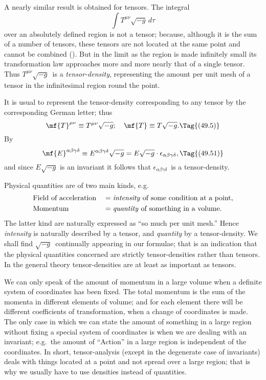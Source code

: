 \documentclass[12pt]{book}
\begin{document}
A nearly similar result is obtained for tensors. The integral
\[
\int T^{\mu\nu} \sqrt{-g}\, d\tau
\]
over an absolutely defined region is not a tensor; because, although it is the
sum of a number of tensors, these tensors are not located at the same point
and cannot be combined (). But in the limit as the region is made
infinitely small its transformation law approaches more and more nearly that
of a single tensor. Thus $T^{\mu\nu} \sqrt{-g}$~is a \emph{tensor\hyp{}density}, representing the amount
%
per unit mesh of a tensor in the infinitesimal region round the point.

It is usual to represent the tensor\hyp{}density corresponding to any tensor by
%
the corresponding German letter; thus
\[
\mf{T}^{\mu\nu} \equiv T^{\mu\nu} \sqrt{-g};\quad
\mf{T} \equiv T \sqrt{-g}.
\Tag{(49.5)}
\]
By 
\[
\mf{E}^{\alpha\beta\gamma\delta} \equiv E^{\alpha\beta\gamma\delta} \sqrt{-g}
= E \sqrt{-g} \cdot \epsilon_{\alpha\beta\gamma\delta},
\Tag{(49.51)}
\]
and since $E \sqrt{-g}$ is an invariant it follows that $\epsilon_{\alpha\beta\gamma\delta}$~is a tensor\hyp{}density.

Physical quantities are of two main kinds, e.g.\
%
%
\begin{alignat*}{2}
  &\text{Field of acceleration}
  &&= \text{\emph{intensity} of some condition at a point,} \\
    &\text{Momentum}
    &&= \text{\emph{quantity} of something in a volume.}
\end{alignat*}
The latter kind are naturally expressed as ``so much per unit mesh.'' Hence
\emph{intensity} is naturally described by a tensor, and \emph{quantity} by a tensor\hyp{}density.
We shall find $\sqrt{-g}$~continually appearing in our formulae; that is an indication
that the physical quantities concerned are strictly tensor\hyp{}densities rather
than tensors. In the general theory tensor\hyp{}densities are at least as important
as tensors.

We can only speak of the amount of momentum in a large volume when
a definite system of coordinates has been fixed. The total momentum is the
sum of the momenta in different elements of volume; and for each element
there will be different coefficients of transformation, when a change of coordinates
is made. The only case in which we can state the amount of something
in a large region without fixing a special system of coordinates is when we
are dealing with an invariant; e.g.\ the amount of ``Action'' in a large region
is independent of the coordinates. In short, tensor-analysis (except in the
degenerate case of invariants) deals with things located at a point and not
spread over a large region; that is why we usually have to use densities
instead of quantities.
\end{document}
